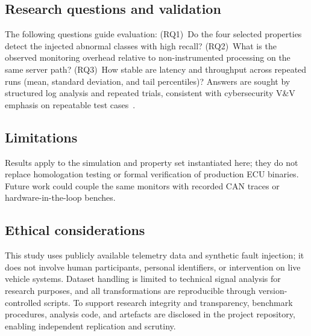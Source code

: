 \subsection{Research questions and validation}

The following questions guide evaluation: (RQ1)~Do the four selected properties detect the injected abnormal classes with high recall? (RQ2)~What is the observed monitoring overhead relative to non-instrumented processing on the same server path? (RQ3)~How stable are latency and throughput across repeated runs (mean, standard deviation, and tail percentiles)? Answers are sought by structured log analysis and repeated trials, consistent with cybersecurity V\&V emphasis on repeatable test cases~\cite{ekert2021cybersecurity}.

\subsection{Limitations}

Results apply to the simulation and property set instantiated here; they do not replace homologation testing or formal verification of production ECU binaries. Future work could couple the same monitors with recorded CAN traces or hardware-in-the-loop benches.

\subsection{Ethical considerations}

This study uses publicly available telemetry data and synthetic fault injection; it does not involve human participants, personal identifiers, or intervention on live vehicle systems. Dataset handling is limited to technical signal analysis for research purposes, and all transformations are reproducible through version-controlled scripts. To support research integrity and transparency, benchmark procedures, analysis code, and artefacts are disclosed in the project repository, enabling independent replication and scrutiny.
